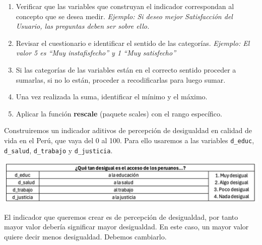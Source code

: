 \documentclass[
]{article}
\providecommand{\tightlist}{%
  \setlength{\itemsep}{0pt}\setlength{\parskip}{0pt}}
\begin{document}
\begin{enumerate}
\def\labelenumi{\arabic{enumi}.}
\tightlist
\item
  Verificar que las variables que construyan el indicador correspondan
  al concepto que se desea medir. \emph{Ejemplo: Si deseo mejor
  Satisfacción del Usuario, las preguntas deben ser sobre ello.}
\item
  Revisar el cuestionario e identificar el sentido de las categorías.
  \emph{Ejemplo: El valor 5 es ``Muy instafisfecho'' y 1 ``Muy
  satisfecho''}
\item
  Si las categorías de las variables están en el correcto sentido
  proceder a sumarlas, si no lo están, proceder a recodificarlas para
  luego sumar.
\item
  Una vez realizada la suma, identificar el mínimo y el máximo.
\item
  Aplicar la función \textbf{rescale} (paquete scales) con el rango
  específico.
\end{enumerate}

Construiremos un indicador aditivos de percepción de desigualdad en
calidad de vida en el Perú, que vaya del 0 al 100. Para ello usaremos a
las variables \texttt{d\_educ}, \texttt{d\_salud}, \texttt{d\_trabajo} y
\texttt{d\_justicia}.

\begin{center}\includegraphics[width=1\linewidth]{tablitaenades2024} \end{center}

El indicador que queremos crear es de percepción de desigualdad, por
tanto mayor valor debería significar mayor desigualdad. En este caso, un
mayor valor quiere decir menos desigualdad. Debemos cambiarlo.
\end{document}
